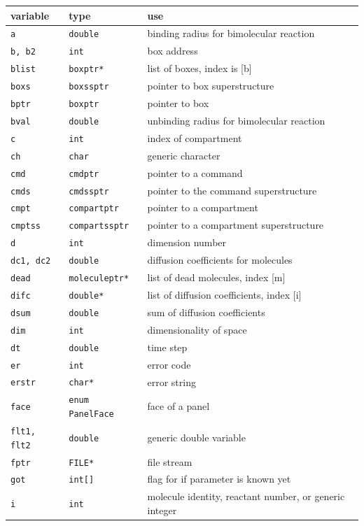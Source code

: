 \documentclass {scrbook}
\newcommand {\ttt} {\texttt}
\begin{document}
\begin{longtable}[c]{lll}
variable & type & use\\
\hline
\ttt{a} & \ttt{double} & binding radius for bimolecular reaction\\
\ttt{b, b2} & \ttt{int} & box address\\
\ttt{blist} & \ttt{boxptr*} & list of boxes, index is [b]\\
\ttt{boxs} & \ttt{boxssptr} & pointer to box superstructure\\
\ttt{bptr} & \ttt{boxptr} & pointer to box\\
\ttt{bval} & \ttt{double} & unbinding radius for bimolecular reaction\\
\ttt{c} & \ttt{int} & index of compartment\\
\ttt{ch} & \ttt{char} & generic character\\
\ttt{cmd} & \ttt{cmdptr} & pointer to a command\\
\ttt{cmds} & \ttt{cmdssptr} & pointer to the command superstructure\\
\ttt{cmpt} & \ttt{compartptr} & pointer to a compartment\\
\ttt{cmptss} & \ttt{compartssptr} & pointer to a compartment superstructure\\
\ttt{d} & \ttt{int} & dimension number\\
\ttt{dc1, dc2} & \ttt{double} & diffusion coefficients for molecules\\
\ttt{dead} & \ttt{moleculeptr*} & list of dead molecules, index [m]\\
\ttt{difc} & \ttt{double*} & list of diffusion coefficients, index [i]\\
\ttt{dsum} & \ttt{double} & sum of diffusion coefficients\\
\ttt{dim} & \ttt{int} & dimensionality of space\\
\ttt{dt} & \ttt{double} & time step\\
\ttt{er} & \ttt{int} & error code\\
\ttt{erstr} & \ttt{char*} & error string\\
\ttt{face} & \ttt{enum PanelFace} & face of a panel\\
\ttt{flt1, flt2} & \ttt{double} & generic double variable\\
\ttt{fptr} & \ttt{FILE*} & file stream\\
\ttt{got} & \ttt{int[]} & flag for if parameter is known yet\\
\ttt{i} & \ttt{int} & molecule identity, reactant number, or generic integer\\

\end{longtable}
\end{document}
